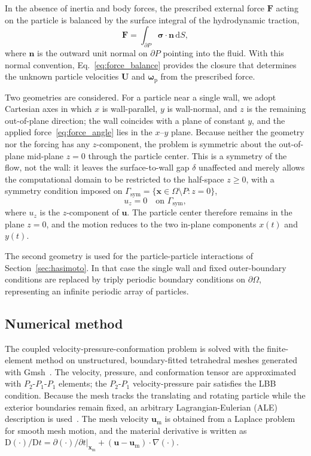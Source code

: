 \documentclass{elsarticle}
\renewcommand{\vec}[1]{\boldsymbol{#1}}
\newcommand{\ten}[1]{\boldsymbol{#1}}
\begin{document}
In the absence of inertia and body forces, the prescribed external
force $\vec{F}$ acting on the particle is balanced by the surface
integral of the hydrodynamic traction,
\begin{equation}
\vec{F} = \int_{\partial P} \ten{\sigma}\cdot\vec{n}\,\mathrm{d}S,
\label{eq:force_balance}
\end{equation}
where $\vec{n}$ is the outward unit normal on $\partial P$ pointing
into the fluid. With this normal convention,
Eq.~\eqref{eq:force_balance} provides the closure that determines the
unknown particle velocities $\vec{U}$ and $\vec{\omega}_{\mathrm{p}}$
from the prescribed force.

Two geometries are considered. For a particle near a single wall, we
adopt Cartesian axes in which $x$ is wall-parallel, $y$ is wall-normal,
and $z$ is the remaining out-of-plane direction; the wall coincides with
a plane of constant $y$, and the applied force~\eqref{eq:force_angle}
lies in the $x$--$y$ plane. Because neither the geometry nor the forcing
has any $z$-component, the problem is symmetric about the
out-of-plane mid-plane $z = 0$ through the particle center. This is a
symmetry of the flow, not the wall: it leaves the surface-to-wall gap
$\delta$ unaffected and merely allows the computational domain to be
restricted to the half-space $z \ge 0$, with a symmetry condition imposed
on $\Gamma_{\mathrm{sym}} = \{\vec{x} \in \Omega \setminus P : z = 0\}$,
\begin{equation}
u_{z} = 0 \quad \text{on } \Gamma_{\mathrm{sym}},
\label{eq:symmetry_bc}
\end{equation}
where $u_{z}$ is the $z$-component of $\vec{u}$. The particle center
therefore remains in the plane $z = 0$, and the motion reduces to the two
in-plane components $x(t)$ and $y(t)$. 

The second geometry is used for the particle-particle interactions of
Section~\ref{sec:hasimoto}. In that case the single wall and fixed
outer-boundary conditions are replaced by triply periodic boundary
conditions on $\partial\Omega$, representing an infinite periodic array
of particles.

\subsection{Numerical method}
\label{sec:numerical_method}

The coupled velocity-pressure-conformation problem is solved with the
finite-element method on unstructured, boundary-fitted tetrahedral
meshes generated with Gmsh~\cite{geuzaine2009gmsh}. The velocity,
pressure, and conformation tensor are approximated with
$P_{2}$-$P_{1}$-$P_{1}$ elements; the $P_{2}$-$P_{1}$ velocity-pressure
pair satisfies the LBB condition. Because the mesh tracks the
translating and rotating particle while the exterior boundaries remain
fixed, an arbitrary Lagrangian-Eulerian (ALE) description is
used~\cite{hu2001direct}. The mesh velocity $\vec{u}_{\mathrm{m}}$ is
obtained from a Laplace problem for smooth mesh motion, and the material
derivative is written as
$\mathrm{D}(\cdot)/\mathrm{D}t
= \partial(\cdot)/\partial t|_{\vec{x}_{\mathrm{m}}}
+ (\vec{u}-\vec{u}_{\mathrm{m}})\cdot\nabla(\cdot)$.
\end{document}
